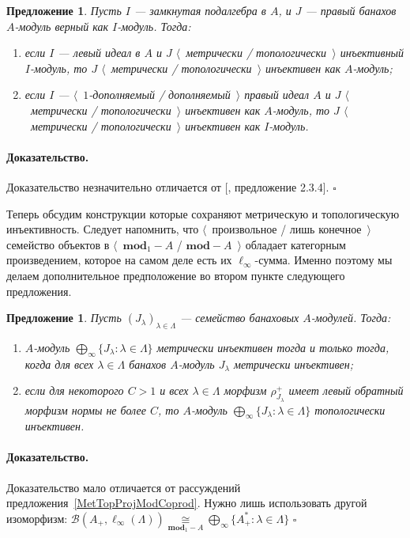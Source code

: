 \documentclass[12pt]{article}
\newcommand{\isom}[1]{\mathop{\mathbin{\cong}}\limits_{#1}}
\newtheorem{proposition}[theorem]{Предложение}
\renewenvironment{proof}{\paragraph{Доказательство.}}{\hfill$\square$\medskip}
\begin{document}
\begin{proposition}\label{MetTopInjUnderChangeOfAlg} Пусть $I$ --- замкнутая
    подалгебра в $A$, и $J$ --- правый банахов $A$-модуль верный как $I$-модуль.
    Тогда:
    \begin{enumerate}[label = (\roman*)]
        \item если $I$ --- левый идеал в $A$ и $J$ $\langle$~метрически /
              топологически~$\rangle$ инъективный $I$-модуль, то $J$ $\langle$~метрически
              / топологически~$\rangle$ инъективен как $A$-модуль;

        \item если $I$ --- $\langle$~$1$-дополняемый / дополняемый~$\rangle$ правый
              идеал $A$ и $J$ $\langle$~метрически / топологически~$\rangle$ инъективен
              как $A$-модуль, то $J$ $\langle$~метрически / топологически~$\rangle$
              инъективен как $I$-модуль.
    \end{enumerate}

\end{proposition}
\begin{proof} Доказательство незначительно отличается от
    [\cite{RamsHomPropSemgroupAlg}, предложение 2.3.4].
\end{proof}

Теперь обсудим конструкции которые сохраняют метрическую и топологическую
инъективность. Следует напомнить, что $\langle$~произвольное / лишь
конечное~$\rangle$ семейство объектов в $\langle$~$\mathbf{mod}_1-A$ /
$\mathbf{mod}-A$~$\rangle$ обладает категорным произведением, которое на самом
деле есть их $\ell_\infty$-сумма. Именно поэтому мы делаем дополнительное
предположение во втором пункте следующего предложения.

\begin{proposition}\label{MetTopInjModProd} Пусть
    ${(J_\lambda)}_{\lambda\in\Lambda}$ --- семейство банаховых $A$-модулей.
    Тогда:
    \begin{enumerate}[label = (\roman*)]
        \item $A$-модуль $\bigoplus_\infty \{J_\lambda:\lambda\in\Lambda \}$
              метрически инъективен тогда и только тогда, когда для всех
              $\lambda\in\Lambda$ банахов $A$-модуль $J_\lambda$ метрически инъективен;

        \item если для некоторого $C>1$ и всех $\lambda\in\Lambda$  морфизм
              $\rho_{J_\lambda}^+$ имеет левый обратный морфизм нормы не более $C$, то
              $A$-модуль $\bigoplus_\infty \{J_\lambda:\lambda\in\Lambda \}$ топологически
              инъективен.
    \end{enumerate}


\end{proposition}
\begin{proof} Доказательство мало отличается от рассуждений
    предложения~\ref{MetTopProjModCoprod}. Нужно лишь использовать другой
    изоморфизм:
    $\mathcal{B}(A_+,\ell_\infty(\Lambda))\isom{\mathbf{mod}_1-A}\bigoplus_\infty
        \{A_+^*:\lambda\in\Lambda \}$
\end{proof}
\end{document}
